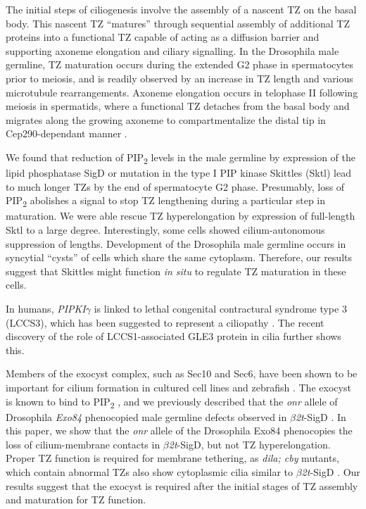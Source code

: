 \documentclass[12pt, twoside, letterpaper]{article}
\newcommand{\PIP}{PIP\textsubscript{2}}
\newcommand{\sigd}{$\beta$\textit{2t}-SigD}
\begin{document}
The initial steps of ciliogenesis involve the assembly of a nascent
TZ on the basal body.
This nascent TZ ``matures'' through sequential assembly of additional
TZ proteins into a functional TZ capable of acting as a diffusion barrier
and supporting axoneme elongation and ciliary signalling.
In the Drosophila male germline, TZ maturation occurs during the
extended G2 phase in spermatocytes prior to meiosis,
and is readily observed by an increase in TZ length
and various microtubule rearrangements.
Axoneme elongation occurs in telophase II following meiosis in
spermatids, where a functional TZ detaches from the basal body
and migrates along the growing axoneme to compartmentalize the distal tip
in Cep290-dependant manner \citep{basiri2014migrating}.

We found that reduction of \PIP{} levels in the male germline by expression
of the lipid phosphatase SigD or mutation in the type I PIP kinase
Skittles (Sktl) lead to much longer TZs by the end of spermatocyte G2 phase.
Presumably, loss of \PIP{} abolishes a signal to stop TZ lengthening during
a particular step in maturation.
We were able rescue TZ hyperelongation by expression of full-length Sktl to
a large degree.
Interestingly, some cells showed cilium-autonomous suppression of lengths.
Development of the Drosophila male germline occurs in syncytial ``cysts''
of cells which share the same cytoplasm.
Therefore, our results suggest that Skittles might function \textit{in situ}
to regulate TZ maturation in these cells.


In humans, \textit{PIPKI$\gamma$} is linked to lethal congenital contractural
syndrome type 3 (LCCS3), which has been suggested to represent a ciliopathy
\citep{}.
The recent discovery of the role of LCCS1-associated GLE3 protein in cilia
further shows this.


Members of the exocyst complex, such as Sec10 and Sec6, have been shown
to be important for cilium formation in cultured cell lines and zebrafish
\citep{zuo2009exocyst, lobo2017exocyst, seixas2016arl13b}.
The exocyst is known to bind to \PIP{}
\citep{he2007exo70, zhang2008membrane}, and we previously described that
the \textit{onr} allele of Drosophila \textit{Exo84} phenocopied
male germline defects observed in \sigd{} \citep{fabian2010phosphatidylinositol}.
In this paper, we show that the \textit{onr} allele of the Drosophila Exo84
phenocopies the loss of cilium-membrane contacts in \sigd{},
but not TZ hyperelongation.
Proper TZ function is required for membrane tethering, as \textit{dila; cby}
mutants, which contain abnormal TZs also show cytoplasmic cilia similar to
\sigd{} \citep{vieillard2016transition}.
Our results suggest that the exocyst is required after the initial stages
of TZ assembly and maturation for TZ function.
\end{document}
